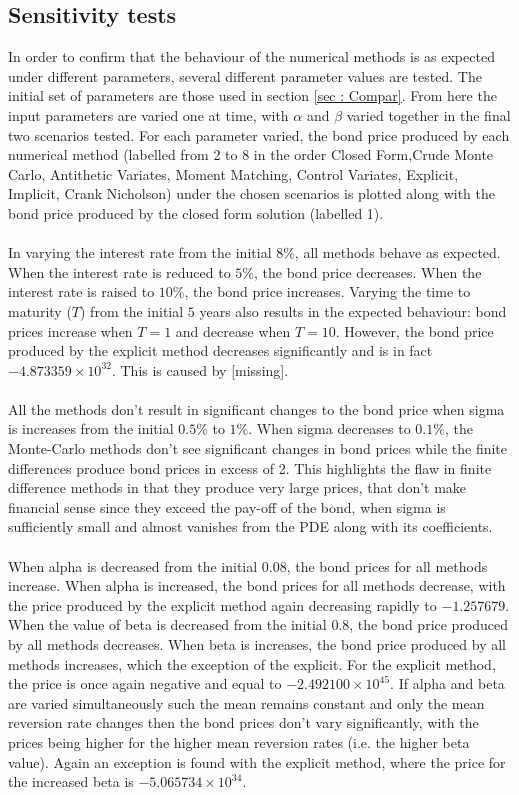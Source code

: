 \documentclass[12pt,a4paper]{article}
\begin{document}
\subsection{Sensitivity tests}
\label{subsec: Senses}
In order to confirm that the behaviour of the numerical methods is as expected under different parameters, several different parameter values are tested. The initial set of parameters are those used in section \ref{sec : Compar}. From here the input parameters are varied one at time, with $\alpha$ and $\beta$ varied together in the final two scenarios tested. For each parameter varied, the bond price produced by each numerical method (labelled from 2 to 8 in the order Closed Form,Crude Monte Carlo, Antithetic Variates, Moment Matching, Control Variates, Explicit, Implicit, Crank Nicholson) under the chosen scenarios is plotted along with the bond price produced by the closed form solution (labelled 1).\\\\
In varying the interest rate from the initial $8\%$, all methods behave as expected. When the interest rate is reduced to $5\%$, the bond price decreases. When the interest rate is raised to $10\%$, the bond price increases.	Varying the time to maturity ($T$) from the initial $5$ years also results in the expected behaviour: bond prices increase when $T=1$ and decrease when $T=10$. However, the bond price produced by the explicit method decreases significantly and is in fact $-4.873359\times10^{32}$. This is caused by [missing].\\\\
All the methods don't result in significant changes to the bond price when sigma is increases from the initial $0.5\%$ to $1\%$. When sigma decreases to $0.1\%$, the Monte-Carlo methods don't see significant changes in bond prices while the finite differences produce bond prices in excess of 2. This highlights the flaw in finite difference methods in that they produce very large prices, that don't make financial sense since they exceed the pay-off of the bond, when sigma is sufficiently small and almost vanishes from the PDE along with its coefficients.\\\\
When alpha is decreased from the initial $0.08$, the bond prices for all methods increase. When alpha is increased, the bond prices for all methods decrease, with the price produced by the explicit method again decreasing rapidly to $-1.257679$. When the value of beta is decreased from the initial $0.8$, the bond price produced by all methods decreases. When beta is increases, the bond price produced by all methods increases, which the exception of the explicit. For the explicit method, the price is once again negative and equal to $-2.492100\times10^{45}$. If alpha and beta are varied simultaneously such the mean remains constant and only the mean reversion rate changes then the bond prices don't vary significantly, with the prices being higher for the higher mean reversion rates (i.e. the higher beta value). Again an exception is found with the explicit method, where the price for the increased beta is $-5.065734\times10^{34}$.
	\newpage
\end{document}
